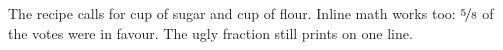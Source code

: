 \documentclass{article}
\begin{document}
The recipe calls for  cup of sugar and  cup of flour.
Inline math works too: $\nicefrac{5}{8}$ of the votes were in favour.
The ugly fraction  still prints on one line.
\end{document}
